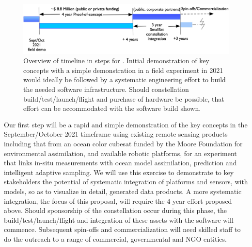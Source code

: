 \begin{figure}[!t]
  \centering
  \includegraphics[scale=0.22]{fig/timeline.jpg}
  \caption{Overview of timeline in steps for \proe. Initial
    demonstration of key concepts with a simple demonstration in a
    field experiment in 2021 would ideally be followed by a systematic
    engineering effort to build the needed software
    infrastructure. Should \sml constellation build/test/launch/flight
    and purchase of hardware be possible, that effort can be
    accommodated with the software build shown.}
  \label{fig:timeline}
\end{figure}

Our first step will be a rapid and simple demonstration of the key
concepts in the September/October 2021 timeframe using existing remote
sensing products including that from an ocean color cubesat funded by
the Moore Foundation for environmental assimilation, and available
robotic platforms, for an experiment that links in-situ measurements
with ocean model assimilation, prediction and intelligent adaptive
sampling. We will use this exercise to demonstrate to key stakeholders
the potential of systematic integration of platforms and sensors, with
models, so as to visualize in detail, generated data products. A more
systematic integration, the focus of this proposal, will require the 4
year effort proposed above. Should sponsorship of the \sml
constellation occur during this phase, the build/test/launch/flight
and integration of these assets with the software will
commence. Subsequent spin-offs and commercialization will need skilled
staff to do the outreach to a range of commercial, governmental and
NGO entities.





